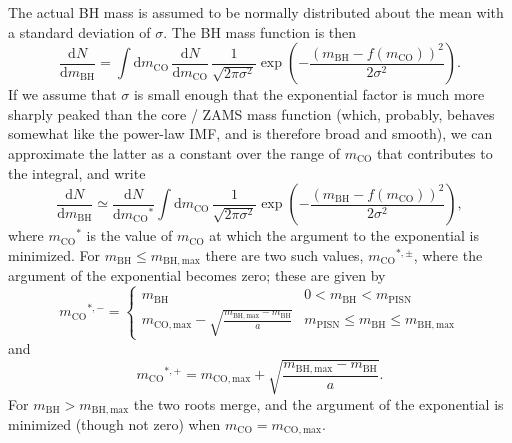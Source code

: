 \documentclass[modern]{aastex631}
\newcommand{\dd}{\ensuremath{\mathrm{d}}}
\newcommand{\mBH}{\ensuremath{m_\mathrm{BH}}}
\newcommand{\mBHMax}{\ensuremath{m_{\mathrm{BH},\mathrm{max}}}}
\newcommand{\mCO}{\ensuremath{m_{\mathrm{CO}}}}
\newcommand{\mCOMax}{\ensuremath{m_{\mathrm{CO},\mathrm{max}}}}
\newcommand{\mPISN}{\ensuremath{m_\mathrm{PISN}}}
\begin{document}
The actual \ac{BH} mass is assumed to be normally distributed about the mean
with a standard deviation of $\sigma$.  The \ac{BH} mass function is then
\begin{equation}
    \frac{\dd N}{\dd \mBH} = \int \dd \mCO \, \frac{\dd N}{\dd \mCO} \, \frac{1}{\sqrt{2\pi\sigma^2}} \exp\left( -\frac{\left( \mBH - f\left( \mCO \right) \right)^2}{2\sigma^2} \right).
\end{equation}
If we assume that $\sigma$ is small enough that the exponential factor is much
more sharply peaked than the core / \ac{ZAMS} mass function (which, probably,
behaves somewhat like the power-law \ac{IMF}, and is therefore broad and
smooth), we can approximate the latter as a constant over the range of $\mCO$
that contributes to the integral, and write 
\begin{equation}
    \label{eq:approx-dNdmBH-integral}
    \frac{\dd N}{\dd \mBH} \simeq \frac{\dd N}{\dd \mCO^*} \int \dd \mCO \, \frac{1}{\sqrt{2\pi\sigma^2}} \exp\left( -\frac{\left( \mBH - f\left( \mCO \right) \right)^2}{2\sigma^2} \right),
\end{equation}
where $\mCO^*$ is the value of $\mCO$ at which the argument to the exponential
is minimized.  For $\mBH \leq \mBHMax$ there are two such values,
$\mCO^{*,{\pm}}$, where the argument of the exponential becomes zero; these are
given by 
\begin{equation}
    \mCO^{*,-} = \begin{cases}
        \mBH & 0 < \mBH < \mPISN \\
        \mCOMax - \sqrt{\frac{\mBHMax - \mBH}{a}} & \mPISN \leq \mBH \leq \mBHMax
    \end{cases}
\end{equation}
and
\begin{equation}
    \mCO^{*,+} = \mCOMax + \sqrt{\frac{\mBHMax - \mBH}{a}}.
\end{equation}
For $\mBH > \mBHMax$ the two roots merge, and the argument of the exponential is
minimized (though not zero) when $\mCO = \mCOMax$.
\end{document}
